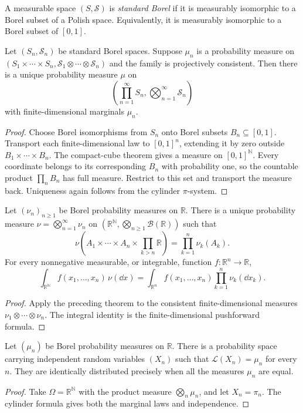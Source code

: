 \begin{de}
A measurable space $(S,\mathcal S)$ is \emph{standard Borel} if it is
measurably isomorphic to a Borel subset of a Polish space. Equivalently, it is
measurably isomorphic to a Borel subset of $[0,1]$.
\end{de}

\begin{thm}
Let $(S_n,\mathcal S_n)$ be standard Borel spaces. Suppose $\mu_n$ is a
probability measure on
$(S_1\times\cdots\times S_n,\mathcal S_1\otimes\cdots\otimes\mathcal S_n)$
and the family is projectively consistent. Then there is a unique probability
measure $\mu$ on
\[
\left(\prod_{n=1}^{\infty}S_n,
      \bigotimes_{n=1}^{\infty}\mathcal S_n\right)
\]
with finite-dimensional marginals $\mu_n$.
\end{thm}

\begin{proof}
Choose Borel isomorphisms from $S_n$ onto Borel subsets $B_n\subseteq[0,1]$.
Transport each finite-dimensional law to $[0,1]^n$, extending it by zero
outside $B_1\times\cdots\times B_n$. The compact-cube theorem gives a measure
on $[0,1]^{\mathbb N}$. Every coordinate belongs to its corresponding $B_n$
with probability one, so the countable product $\prod_nB_n$ has full measure.
Restrict to this set and transport the measure back. Uniqueness again follows
from the cylinder $\pi$-system.
\end{proof}

\begin{thm}
Let $(\nu_n)_{n\ge1}$ be Borel probability measures on $\mathbb R$. There is
a unique probability measure
$\nu=\bigotimes_{n=1}^{\infty}\nu_n$ on
$(\mathbb R^{\mathbb N},\bigotimes_{n\ge1}\mathcal B(\mathbb R))$ such that
\[
\nu\!\left(A_1\times\cdots\times A_n\times
           \prod_{k>n}\mathbb R\right)
 =\prod_{k=1}^{n}\nu_k(A_k).
\]
For every nonnegative measurable, or integrable, function
$f:\mathbb R^n\to\mathbb R$,
\[
\int_{\mathbb R^{\mathbb N}}f(x_1,\ldots,x_n)\,\nu(\dd x)
 =\int_{\mathbb R^n}f(x_1,\ldots,x_n)
   \prod_{k=1}^{n}\nu_k(\dd x_k).
\]
\end{thm}

\begin{proof}
Apply the preceding theorem to the consistent finite-dimensional measures
$\nu_1\otimes\cdots\otimes\nu_n$. The integral identity is the
finite-dimensional pushforward formula.
\end{proof}

\begin{cor}
Let $(\mu_n)$ be Borel probability measures on $\mathbb R$. There is a
probability space carrying independent random variables $(X_n)$ such that
$\mathcal L(X_n)=\mu_n$ for every $n$. They are identically distributed
precisely when all the measures $\mu_n$ are equal.
\end{cor}

\begin{proof}
Take $\Omega=\mathbb R^{\mathbb N}$ with the product measure
$\bigotimes_n\mu_n$, and let $X_n=\pi_n$. The cylinder formula gives both the
marginal laws and independence.
\end{proof}
